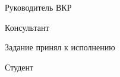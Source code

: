 \intervalS%

Руководитель ВКР \uline{\hspace*{0.325\textheight} \Supervisor}


\intervalS%

Консультант  \uline{\hspace*{0.38\textheight}\ConsultantExtra}


\intervalS%


Задание принял к исполнению

\intervalS%

Студент \uline{\hspace*{0.41\textheight}  \Author}



